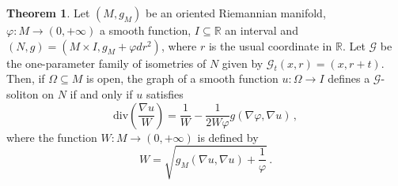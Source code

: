 \documentclass[oneside,12pt]{amsart}
\theoremstyle{definition}
\newtheorem{theorem}[lemma]{Theorem}
\newcommand{\R}{\mathbb{R}}
\begin{document}
\begin{theorem}\label{thm:pde}
Let $(M,g_M)$ be an oriented Riemannian manifold, $\varphi \colon M \to (0,+\infty)$ a smooth function, $I \subseteq \R$ an interval and $(N,g) = (M \times I , g_M + \varphi dr^2)$, where $r$ is the usual coordinate in $\R$. Let $\mathcal{G}$ be the one-parameter family of isometries of $N$ given by $\mathcal{G}_t (x,r) = (x , r+t)$. Then, if $\Omega \subseteq M$ is open, the graph of a smooth function $u \colon \Omega \to I$ defines a $\mathcal{G}$-soliton on $N$ if and only if $u$ satisfies
\begin{equation}\label{eq:pde}
    \mathrm{div}\left(\frac{\nabla u}{W}\right)=\frac{1}{W}-\frac{1}{2W\varphi}g(\nabla \varphi,\nabla u) \, ,
\end{equation}
where the function $W \colon M \to (0,+\infty)$ is defined by
\begin{equation}\label{eq:defW}
    W = \sqrt{g_M(\nabla u , \nabla u) + \frac{1}{\varphi}} \, .
\end{equation}
\end{theorem}
\end{document}
